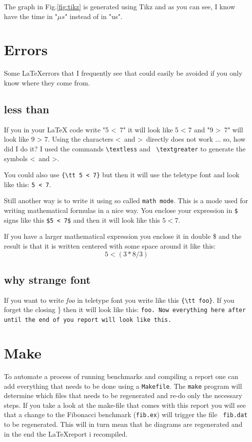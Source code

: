 \documentclass[a4paper,11pt]{article}
\begin{document}
The graph in Fig.\ref{fig:tikz} is generated using Tikz and as you can
see, I know have the time in "$\mu s$" instead of in "us".

\section*{Errors}

Some \LaTeX errors that I frequently see that could easily be avoided
if you only know where they come from.

\subsection*{less than}

If you in your LaTeX code write "5 \textless\ 7" it will look like 5 <
7 and "9 \textgreater\ 7" will look like 9 > 7. Using the characters
\textless\ and \textgreater\ directly does not work ... so, how did I
do it?  I used the commands {\tt  \textbackslash textless} and {\tt
  \textbackslash textgreater} to generate the symbols \textless\ and
\textgreater.

You could also use {\tt \{\textbackslash tt 5 < 7\}} but then it
will use the teletype font and look like this: {\tt 5 < 7}.

Still another way is to write it using so called {\tt math mode}. This
is a mode used for writing mathematical formulas in a nice way. You
enclose your expression in {\tt \$} signs like this {\tt \$5 < 7\$}
and then it will look like this $5 < 7$.

If you have a larger mathematical expression you enclose it in double
\$ and the result is that it is written centered with some space
around it like this:  $$ 5 < (3 * 8 / 3 ) $$

\subsection*{why strange font}

If you want to write {\em foo} in teletype font you write like this
\verb+{\tt foo}+. If you forget the closing \} then it will look like
this: {\tt foo. Now everything here after until the end of you report
  will look like this. }

\section*{Make}

To automate a process of running benchmarks and compiling a report one
can add everything that needs to be done using a {\tt Makefile}. The
{\tt make} program will determine which files that needs to be
regenerated and re-do only the necessary steps. If you take a look at
the make-file that comes with this report you will see that a change
to the Fibonacci benchmark ({\tt fib.ex}) will trigger the file {\tt
  fib.dat} to be regenerated. This will in turn mean that he diagrams
are regenerated and in the end the \LaTeX report i recompiled.
\end{document}
